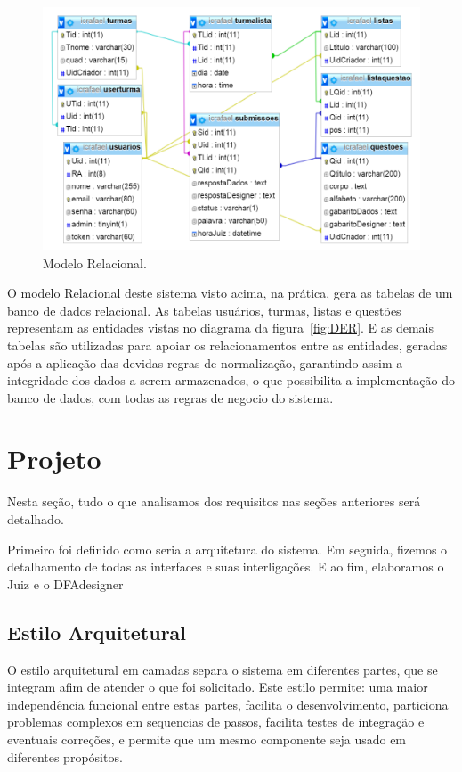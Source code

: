 \documentclass[
	12pt,				%
	openany,
	oneside,
	a4paper,			%
	english,			%
	brazil				%
	]{abntex2}
\begin{document}
\begin{figure}[H]
  \centering
  \includegraphics[width=\textwidth]{modRelacional.png}%
  \caption{Modelo Relacional.}
  \label{fig:MR}
\end{figure}

  O modelo Relacional deste sistema visto acima, na prática, gera as tabelas de um banco de dados relacional. As tabelas usuários, turmas, listas e questões representam as entidades vistas no diagrama da figura~\ref{fig:DER}. E as demais tabelas são utilizadas para apoiar os relacionamentos entre as entidades, geradas após a aplicação das devidas regras de normalização, garantindo assim a integridade dos dados a serem armazenados, o que possibilita a implementação do banco de dados, com todas as regras de negocio do sistema.



\section{Projeto}

  Nesta seção, tudo o que analisamos dos requisitos nas seções anteriores será detalhado. %

  Primeiro foi definido como seria a arquitetura do sistema. Em seguida, fizemos o detalhamento de todas as interfaces e suas interligações. E ao fim, elaboramos o Juiz e o DFAdesigner


  \subsection{Estilo Arquitetural}
  O estilo arquitetural em camadas separa o sistema em diferentes partes, que se integram afim de atender o que foi solicitado. Este estilo permite: uma maior independência funcional entre estas partes, facilita o desenvolvimento, particiona problemas complexos em sequencias de passos, facilita testes de integração e eventuais correções, e permite que um mesmo componente seja usado em diferentes propósitos.
\end{document}
